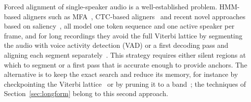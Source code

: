 



Forced alignment of single-speaker audio is a well-established problem. HMM-based aligners such as MFA~\cite{mcauliffe2017montreal, povey2011kaldi}, CTC-based aligners~\cite{CTC_align, rastorgueva2023nfa, bain2023whisperx} and recent novel approaches based on saliency~\cite{zeyer2026gradient}, all model one token sequence and one active speaker per frame, and for long recordings they avoid the full Viterbi lattice by segmenting the audio with voice activity detection (VAD) or a first decoding pass and aligning each segment separately~\cite{moreno1998recursive, katsamanis2011sailalign, biased_LMs}. This strategy requires either silent regions at which to segment or a first pass that is accurate enough to provide anchors. The alternative is to keep the exact search and reduce its memory, for instance by checkpointing the Viterbi lattice~\cite{tarnas1998reduced} or by pruning it to a band~\cite{kuang2022pruned}; the techniques of Section~\ref{sec:longform} belong to this second approach.

